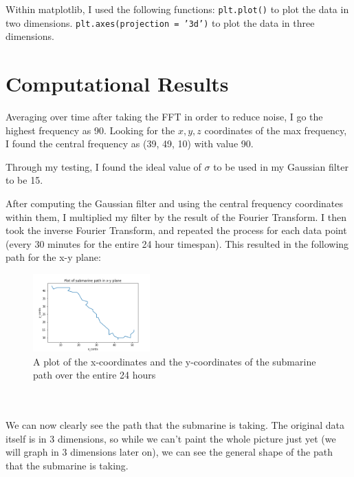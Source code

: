 \documentclass[11pt]{amsart}
\begin{document}
Within matplotlib, I used the following functions:
\subitem \texttt{plt.plot()} to plot the data in two dimensions.
\subitem \texttt{plt.axes(projection = '3d')} to plot the data in three dimensions.



\section{Computational Results}\label{sec:results}

Averaging over time after taking the FFT in order to reduce noise, I go the highest frequency as 90. Looking for the $x, y, z$ coordinates
of the max frequency, I found the central frequency as (39, 49, 10) with value 90. 

Through my testing, I found the ideal value of $\sigma$ to be used in my Gaussian filter to be 15. 

After computing the Gaussian filter and using the central frequency coordinates within them, I multiplied 
my filter by the result of the Fourier Transform. I then took the inverse Fourier Transform, and repeated the
process for each data point (every 30 minutes for the entire 24 hour timespan). This resulted in 
the following path for the x-y plane:
\begin{figure}[H]
    \centering
    \includegraphics[width=0.4\textwidth]{./images/submarine_path_xy.png}
    \caption{A plot of the x-coordinates and the y-coordinates of the submarine path over the 
    entire 24 hours\\\\\\}
    \label{fig:subXY}
\end{figure}
We can now clearly see the path that the submarine is taking. The original data itself is in 3 dimensions, 
so while we can't paint the whole picture just yet (we will graph in 3 dimensions later on), we can 
see the general shape of the path that the submarine is taking.
\end{document}
